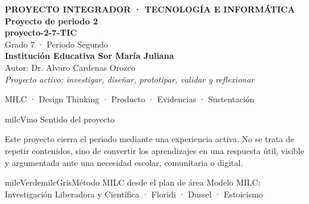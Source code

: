 \documentclass[11pt,letterpaper]{article}
\begin{document}
\thispagestyle{empty}

\vspace*{.85cm}
\begin{tcolorbox}[
  enhanced,colback=milcVino,colframe=milcVino,arc=12mm,width=.86\textwidth,
  boxrule=0pt,left=12mm,right=12mm,top=11mm,bottom=11mm,center,
  overlay={\draw[milcMagenta,line width=2pt,dash pattern=on 9pt off 8pt,rounded corners=10mm]
  ([xshift=7mm,yshift=-7mm]frame.north west) rectangle ([xshift=-7mm,yshift=7mm]frame.south east);}]
  \centering
  {\sffamily\bfseries\color{white}\fontsize{15}{17}\selectfont PROYECTO INTEGRADOR · TECNOLOGÍA E INFORMÁTICA}\\[1.0cm]
  {\sffamily\bfseries\color{white}\fontsize{30}{33}\selectfont Proyecto de periodo 2}\\[3mm]
  {\sffamily\bfseries\color{milcMostaza}\fontsize{25}{28}\selectfont proyecto-2-7-TIC}\\[8mm]
  {\sffamily\color{white}\Large Grado 7 · Periodo Segundo}\\[1.0cm]
  {\sffamily\bfseries\color{white}\large Institución Educativa Sor María Juliana}\\[2mm]
  {\sffamily\color{white}Autor: Dr. Alvaro Cardenas Orozco}\\[4mm]
  {\sffamily\itshape\color{white}Proyecto activo: investigar, diseñar, prototipar, validar y reflexionar}
\end{tcolorbox}
\vfill
\begin{tcolorbox}[enhanced,colback=milcVino!72!black,colframe=milcVino!72!black,arc=5mm,boxrule=0pt,width=.86\textwidth,left=6mm,right=6mm,top=4mm,bottom=4mm,center]
{\color{white}\sffamily\small MILC · Design Thinking · Producto · Evidencias · Sustentación}
\end{tcolorbox}

\newpage
\begin{titlebox}{milcVino}
Sentido del proyecto
\end{titlebox}
\begin{multicols}{2}
Este proyecto cierra el periodo mediante una experiencia activa. No se trata de repetir contenidos, sino de convertir los aprendizajes en una respuesta útil, visible y argumentada ante una necesidad escolar, comunitaria o digital.

\columnbreak
\begin{softbox}{milcVerde}{milcGris}{Método MILC desde el plan de área}
Modelo MILC: Investigación Liberadora y Científica · Floridi · Dussel · Estoicismo
\end{softbox}
\end{multicols}
\end{document}
